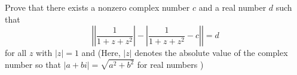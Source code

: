 Prove that there exists a nonzero complex number $c$ and a real number $d$ such that \[\left|\left|\dfrac1{1+z+z^2}\right|-\left|\dfrac1{1+z+z^2}-c\right|\right|=d\] for all $z$ with $|z|=1$ and   (Here, $|z|$ denotes the absolute value of the complex number  so that $|a+bi|=\sqrt{a^2+b^2}$ for real numbers )